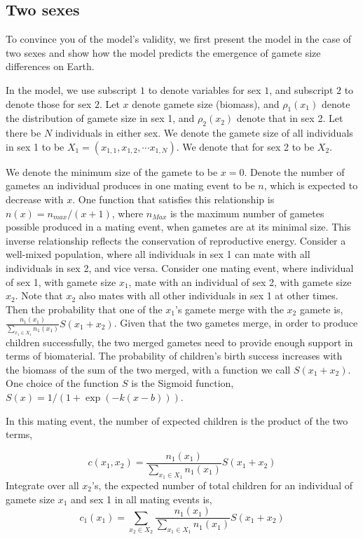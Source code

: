 \subsection*{Two sexes}
To convince you of the model's validity, we first present the model in the case of two sexes and show how the model predicts the emergence of gamete size differences on Earth. 

In the model, we use subscript $1$ to denote variables for sex $1$, and subscript $2$ to denote those for sex $2$. Let $x$ denote gamete size (biomass), and $\rho_1(x_1)$ denote the distribution of gamete size in sex 1, and $\rho_2(x_2)$ denote that in sex 2. Let there be $N$ individuals in either sex. We denote the gamete size of all individuals in sex 1 to be $X_1 = (x_{1,1}, x_{1,2}, \cdots x_{1,N})$. We denote that for sex 2 to be $X_2$. 

We denote the minimum size of the gamete to be $x = 0$. Denote the number of gametes an individual produces in one mating event to be $n$, which is expected to decrease with $x$. One function that satisfies this relationship is $n(x) = n_{max}/(x + 1)$, where $n_{Max}$ is the maximum number of gametes possible produced in a mating event, when gametes are at its minimal size. This inverse relationship reflects the conservation of reproductive energy. 
Consider a well-mixed population, where all individuals in sex 1 can mate with all individuals in sex 2, and vice versa. Consider one mating event, where individual of sex 1, with gamete size $x_1$, mate with an individual of sex 2, with gamete size $x_2$. Note that $x_2$ also mates with all other individuals in sex 1 at other times. Then the probability that one of the $x_1$'s gamete merge with the $x_2$ gamete is, $ \frac{n_1(x_1)}{\sum_{x_1\in X_1} n_1(x_1)}S(x_1+ x_2)$. Given that the two gametes merge, in order to produce children successfully, the two merged gametes need to provide enough support in terms of biomaterial. The probability of children's birth success increases with the biomass of the sum of the two merged, with a function we call $S(x_1 + x_2)$. One choice of the function $S$ is the Sigmoid function, $S(x) = 1/(1 + \exp(-k (x - b)))$. 

In this mating event, the number of expected children is the product of the two terms,  

\begin{equation}\label{eq:c1}
    c(x_1, x_2) = \frac{n_1(x_1)}{\sum_{x_1\in X_1} n_1(x_1)}S(x_1+ x_2)
\end{equation}
Integrate over all $x_2$'s, the expected number of total children for an individual of gamete size $x_1$ and sex 1 in all mating events is, 
\begin{equation}
    c_1(x_1) = \sum_{x_2 \in X_2} \frac{n_1(x_1)}{\sum_{x_1\in X_1} n_1(x_1)} S(x_1+ x_2) 
\end{equation}

